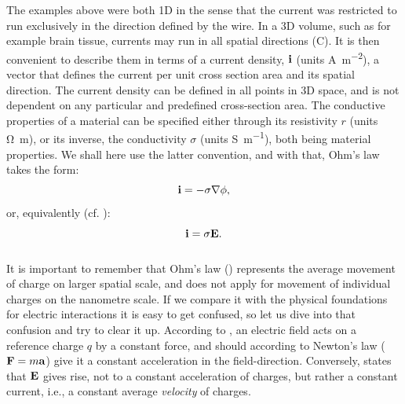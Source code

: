 The examples above were both 1D in the sense that the current was restricted to run exclusively in the direction defined by the wire. In a 3D volume, such as for example brain tissue, currents may run in all spatial directions (C). It is then convenient to describe them in terms of a current density, ${\bf i}$ (units \si{\ampere\per\square\metre}), a vector that defines the current per unit cross section area and its spatial direction. The current density can be defined in all points in 3D space, and is not dependent on any particular and predefined cross-section area. The conductive properties of a material can be specified either through its resistivity $r$ (units \si{\ohm\metre}), or its inverse, the conductivity $\sigma$ (units \si{\siemens\per\metre}), both being material properties. We shall here use the latter convention, and with that, Ohm's law takes the form:
\begin{equation}
{\bf i} = - \sigma {\bf \nabla} \phi,
\label{eq:Basics:Ohm_3D_phi}
\end{equation}
%
or, equivalently (cf. ):
\begin{equation}
{\bf i} = \sigma {\bf E}.
\label{eq:Basics:Ohm_general}
\end{equation}


\subsubsection{}
\label{sec:Basics:Note}
It is important to remember that Ohm's law () represents the average movement of charge on larger spatial scale, and does not apply for movement of individual charges on the nanometre scale. If we compare it with the physical foundations for electric interactions it is easy to get confused, so let us dive into that confusion and try to clear it up. According to , an electric field acts on a reference charge $q$ by a constant force, and should according to Newton's law (${\bf F} = m{\bf a}$) give it a constant acceleration in the field-direction. Conversely,  states that ${\bf E}$ gives rise, not to a constant acceleration of charges, but rather a constant current, i.e., a constant average \textit{velocity} of charges.

